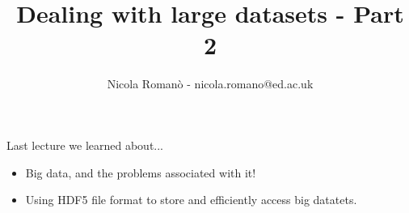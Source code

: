 \documentclass[9pt, aspectratio=169]{beamer}
\author{Nicola Roman\`o - nicola.romano@ed.ac.uk}
\title{Dealing with large datasets - Part 2}
\date{}
\begin{document}

\begin{frame}
	\titlepage
\end{frame}

\begin{frame}
	{Last lecture we learned about...}
	\begin{itemize}
		\item Big data, and the problems associated with it!
		\item Using HDF5 file format to store and efficiently access big datatets.
	\end{itemize}
\end{frame}
\end{document}
